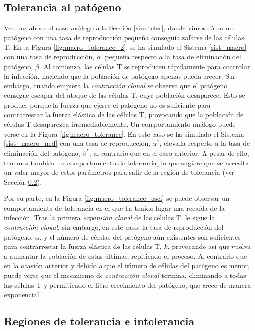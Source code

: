 \subsection{Tolerancia al patógeno}
\label{sub:simMacroToler}

Veamos ahora al caso análogo a la Sección \ref{sim:toler}, donde vimos cómo un patógeno con una tasa de reproducción pequeña conseguía zafarse de las células T. En la Figura \ref{fig:macro_tolerance_2}, se ha simulado el Sistema \ref{sist_macro} con una tasa de reproducción, $\alpha$, pequeña respecto a la tasa de eliminación del patógeno, $\beta$. Al comienzo, las células T se reproducen rápidamente para controlar la infección, haciendo que la población de patógeno apenas pueda crecer. Sin embargo, cuando empieza la \textit{contracción clonal} se observa que el patógeno consigue escapar del ataque de las células T, cuya población desaparece. Esto se produce porque la fuerza que ejerce el patógeno no es suficiente para contrarrestar la fuerza elástica de las células T, provocando que la población de células T desaparezca irremediablemente. Un comportamiento análogo puede verse en la Figura \ref{fig:macro_tolerance}. En este caso se ha simulado el Sistema \ref{sist_macro_nod} con una tasa de reproducción, $\alpha^{*}$, elevada respecto a la tasa de eliminación del patógeno, $\beta^{*}$, al contrario que en el caso anterior. A pesar de ello, tenemos también un comportamiento de tolerancia, lo que sugiere que se necesita un valor mayor de estos parámetros para salir de la región de tolerancia (ver Sección \ref{sub:reg_tolerIntolerMacro}).  

Por su parte, en la Figura \ref{fig:macro_tolerance_osci} se puede observar un comportamiento de tolerancia en el que ha tenido lugar una recaída de la infección. Tras la primera \textit{expansión clonal} de las células T, le sigue la \textit{contracción clonal}, sin embargo, en este caso, la tasa de reproducción del patógeno, $\alpha$, y el número de células del patógeno aún existentes son suficientes para contrarrestar la fuerza elástica de las células T, $k$, provocando así que vuelva a aumentar la población de estas últimas, repitiendo el proceso. Al contrario que en la ocasión anterior y debido a que el número de células del patógeno es menor, puede verse que el mecanismo de \textit{contracción clonal} termina, eliminando a todas las células T y permitiendo el libre crecimiento del patógeno, que crece de manera exponencial.

\subsection{Regiones de tolerancia e intolerancia}
\label{sub:reg_tolerIntolerMacro}

